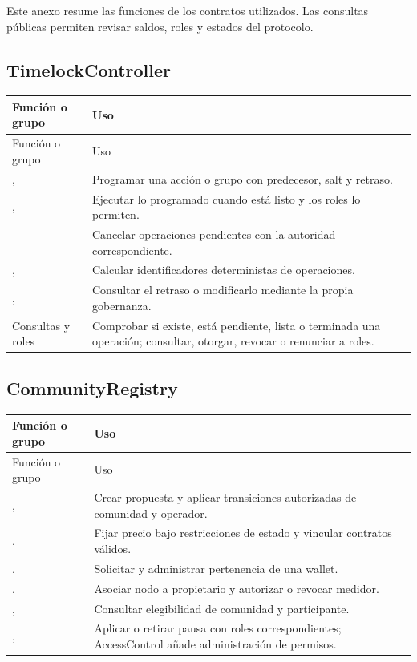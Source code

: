 Este anexo resume las funciones de los contratos utilizados. Las consultas públicas permiten revisar saldos, roles y estados del protocolo.

\subsection{TimelockController}
\begin{longtable}{L{.37\linewidth}L{.53\linewidth}}
\toprule Función o grupo & Uso \\ \midrule\endfirsthead
\toprule Función o grupo & Uso \\ \midrule\endhead
{},  & Programar una acción o grupo con predecesor, salt y retraso.\\
,  & Ejecutar lo programado cuando está listo y los roles lo permiten.\\
 & Cancelar operaciones pendientes con la autoridad correspondiente.\\
,  & Calcular identificadores deterministas de operaciones.\\
,  & Consultar el retraso o modificarlo mediante la propia gobernanza.\\
Consultas y roles & Comprobar si existe, está pendiente, lista o terminada una operación; consultar, otorgar, revocar o renunciar a roles.\\
\bottomrule
\end{longtable}
\subsection{CommunityRegistry}
\begin{longtable}{L{.37\linewidth}L{.53\linewidth}}
\toprule Función o grupo & Uso \\ \midrule\endfirsthead
\toprule Función o grupo & Uso \\ \midrule\endhead
{},  & Crear propuesta y aplicar transiciones autorizadas de comunidad y operador.\\
,  & Fijar precio bajo restricciones de estado y vincular contratos válidos.\\
,  & Solicitar y administrar pertenencia de una wallet.\\
,  & Asociar nodo a propietario y autorizar o revocar medidor.\\
,  & Consultar elegibilidad de comunidad y participante.\\
,  & Aplicar o retirar pausa con roles correspondientes; AccessControl añade administración de permisos.\\
\bottomrule
\end{longtable}
